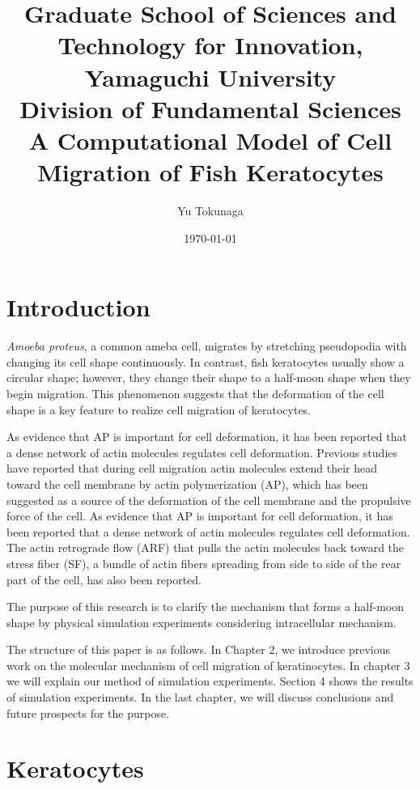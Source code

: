 \documentclass[a4paper,12pt, oneside]{book}
\title{\Large Graduate School of Sciences and Technology for Innovation, Yamaguchi University\\[1cm]
Division of Fundamental Sciences\\[3cm]
\huge A Computational Model of Cell Migration of Fish Keratocytes\\[5cm]
}
\author{Yu Tokunaga}
\date{\Large \today}
\begin{document}
\maketitle
\setcounter{page}{1}
\tableofcontents
\chapter{Introduction}
\setcounter{page}{1}
{\it Amoeba proteus},  a common ameba cell, migrates by stretching pseudopodia with changing  its cell shape continuously.
In contrast, fish keratocytes usually show a circular shape; however, they change their shape to a half-moon shape when they begin migration. This phenomenon suggests that the deformation of the cell shape is a key feature to realize cell migration of keratocytes.

As evidence that AP is important for cell deformation, it has been reported that a dense network of actin molecules regulates cell deformation\cite{svitkina1997analysis}.
Previous studies have reported that during cell migration actin molecules extend their head toward the cell membrane by actin polymerization (AP), which has been suggested as a source of the deformation of the cell membrane and the propulsive force of the cell.
As evidence that AP is important for cell deformation, it has been reported that a dense network of actin molecules regulates cell deformation.
The actin retrograde flow (ARF) that pulls the actin molecules back toward the stress fiber (SF), a bundle of actin fibers spreading from side to side of the rear part of the cell, has also been reported\cite{swaminathan2017actin}.

The purpose of this research is to clarify the mechanism that forms a half-moon shape by physical simulation experiments considering intracellular mechanism.

The structure of this paper is as follows. In Chapter 2, we introduce previous work on the molecular mechanism of cell migration of keratinocytes. In chapter 3 we will explain our method of simulation experiments. Section 4 shows the results of simulation experiments. In the last chapter, we will discuss conclusions and future prospects for the purpose.


\chapter{Keratocytes}
\end{document}
